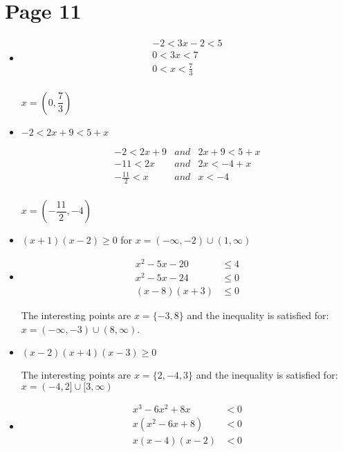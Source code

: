 \documentclass[fleqn,addpoints]{exam}
\begin{document}
\section{Page 11}
\begin{itemize}

\item[13]
\begin{align*}
  -2 < 3x - 2 < 5 \\
  0 < 3x  < 7 \\
  0 < x < \frac{7}{3} \\
\end{align*}

$x = \left(0, \dfrac{7}{3} \right)$

\item[14]
$-2 < 2x + 9 < 5 + x$

\begin{eqnarray*}
  -2 < 2x + 9 & and & 2x + 9 < 5 + x \\
  -11 < 2x    & and & 2x < -4 + x \\
  -\frac{11}{2} < x  & and & x < -4 \\
\end{eqnarray*}

$x = \left( -\dfrac{11}{2}, -4 \right)$

\item[15]
$(x+1)(x-2) \geq 0$ for $x = (-\infty, -2) \cup (1, \infty)$

\item[16]
\begin{align*}
  x^2 - 5x - 20 & \leq 4 \\
  x^2 - 5x - 24 & \leq 0 \\
  (x-8)(x+3) & \leq 0
\end{align*}

The interesting points are $x= \{-3, 8\}$ and the inequality is satisfied for: $x = (-\infty, -3) \cup (8, \infty)$.

\item[17]
$(x-2)(x+4)(x-3) \geq 0$ 

The interesting points are $x=\{2, -4, 3\}$ and the inequality is satisfied for: $x = (-4, 2] \cup [3, \infty)$

\item[18]
\begin{align*}
  x^3-6x^2+8x &< 0 \\
  x(x^2-6x+8) &< 0 \\
  x(x-4)(x-2) &< 0 \\
\end{align*}


\end{itemize}
\end{document}
